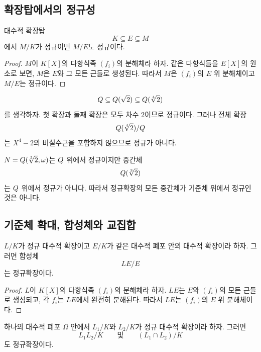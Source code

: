 \subsection{확장탑에서의 정규성}

\begin{proposition}[위쪽 정규성]
대수적 확장탑
\[
  K\subseteq E\subseteq M
\]
에서 $M/K$가 정규이면 $M/E$도 정규이다.
\end{proposition}

\begin{proof}
$M$이 $K[X]$의 다항식족 $(f_i)$의 분해체라 하자. 같은 다항식들을 $E[X]$의 원소로 보면, $M$은 $E$와 그 모든 근들로 생성된다. 따라서 $M$은 $(f_i)$의 $E$ 위 분해체이고 $M/E$는 정규이다.
\end{proof}

\begin{example}
\[
  Q\subseteq Q(\sqrt2)\subseteq Q(\sqrt[4]{2})
\]
를 생각하자. 첫 확장과 둘째 확장은 모두 차수 $2$이므로 정규이다. 그러나 전체 확장
\[
  Q(\sqrt[4]{2})/Q
\]
는 $X^4-2$의 비실수근을 포함하지 않으므로 정규가 아니다.
\end{example}

\begin{example}
$N=Q(\sqrt[3]{2},\omega)$는 $Q$ 위에서 정규이지만 중간체
\[
  Q(\sqrt[3]{2})
\]
는 $Q$ 위에서 정규가 아니다. 따라서 정규확장의 모든 중간체가 기준체 위에서 정규인 것은 아니다.
\end{example}

\subsection{기준체 확대, 합성체와 교집합}

\begin{proposition}[기준체 확대]
$L/K$가 정규 대수적 확장이고 $E/K$가 같은 대수적 폐포 안의 대수적 확장이라 하자. 그러면 합성체
\[
  LE/E
\]
는 정규확장이다.
\end{proposition}

\begin{proof}
$L$이 $K[X]$의 다항식족 $(f_i)$의 분해체라 하자. $LE$는 $E$와 $(f_i)$의 모든 근들로 생성되고, 각 $f_i$는 $LE$에서 완전히 분해된다. 따라서 $LE$는 $(f_i)$의 $E$ 위 분해체이다.
\end{proof}

\begin{theorem}
하나의 대수적 폐포 $\Omega$ 안에서 $L_1/K$와 $L_2/K$가 정규 대수적 확장이라 하자. 그러면
\[
  L_1L_2/K
  \qquad\text{및}\qquad
  (L_1\cap L_2)/K
\]
도 정규확장이다.
\end{theorem}

